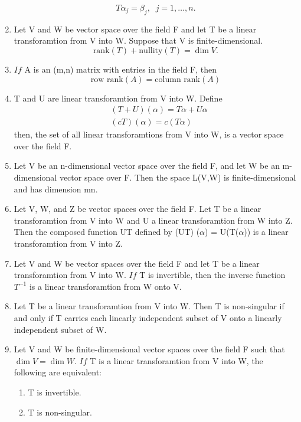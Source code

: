 \documentclass[12pt, a4paper]{article}
\begin{document}
\begin{CJK*}{UTF8}{bsmi}
\begin{enumerate}
\begin{equation}
        T\alpha_j = \beta_j,\;\;j=1,\ldots,n.
    \end{equation}
    \item Let V and W be vector space over the field F and let T be a linear transforamtion from V into W. Suppose that V is finite-dimensional.\begin{equation}
        \text{rank}(T)+ \text{nullity}(T) = \dim V.
    \end{equation}
    \item \(If\) A is an (m,n) matrix with entries in the field F, then\begin{equation}
        \text{row rank} (A) = \text{column rank}(A)
    \end{equation}
    \item T and U are linear transforamtion from V into W. Define\begin{align}
        &(T+U)(\alpha) = T\alpha+U\alpha\\
        &(cT)(\alpha) = c(T\alpha)
    \end{align}
    then, the set of all linear transforamtions from V into W, is a vector space over the field F.
    \item Let V be an n-dimensional vector space over the field F, and let W be an m-dimensional vector space over F. Then the space L(V,W) is finite-dimensional and has dimension mn.
    \item Let V, W, and Z be vector spaces over the field F. Let T be a linear transforamtion from V into W and U a linear transforamtion from W into Z. Then the composed function UT defined by (UT) (\(\alpha\)) = U(T(\(\alpha\))) is a linear transforamtion from V into Z.
    \item Let V and W be vector spaces over the field F and let T be a linear transforamtion from V into W. \(If\) T is invertible, then the inverse function \(T^{-1}\) is a linear transforamtion from W onto V.
    \item Let T be a linear transforamtion from V into W. Then T is non-singular if and only if T carries each linearly independent subset of V onto a linearly independent subset of W.
    \item Let V and W be finite-dimensional vector spaces over the field F such that \(\dim V = \dim W\). \(If\) T is a linear transforamtion from V into W, the following are equivalent:\begin{enumerate}
        \item T is invertible.
        \item T is non-singular.

\end{enumerate}
\end{enumerate}
\end{CJK*}
\end{document}
